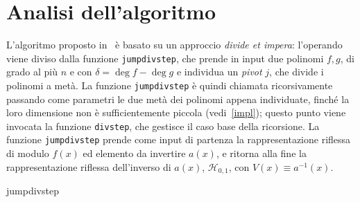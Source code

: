 \section{Analisi dell'algoritmo}
L'algoritmo proposto in~\cite{bernstein2019fast} è basato su un approccio \textit{divide et impera}: l'operando viene diviso dalla funzione
\texttt{jumpdivstep}, che prende in input due polinomi $f, g$, di grado al più $n$ e con $\delta = \deg{f} - \deg{g}$ e individua
un \textit{pivot} $j$, che divide i polinomi a metà. La funzione \texttt{jumpdivstep} è quindi chiamata ricorsivamente passando come parametri le due 
metà dei polinomi appena individuate, finché la loro dimensione non è sufficientemente piccola (vedi~\ref{impl}); questo punto viene invocata la 
funzione \texttt{divstep}, che gestisce il caso base della ricorsione. 
La funzione \texttt{jumpdivstep} prende come input di partenza la rappresentazione riflessa di modulo $f(x)$ ed elemento da invertire $a(x)$, e ritorna alla fine
 la rappresentazione riflessa dell'inverso di $a(x)$, $\mathcal{H}_{0,1}$, con $V(x) \equiv a^{-1}(x)$.

 \begin{algorithm}
    \small
    \SetAlgoLined
    \BlankLine

    \BlankLine

     \caption{jumpdivstep}
    \end{algorithm}
